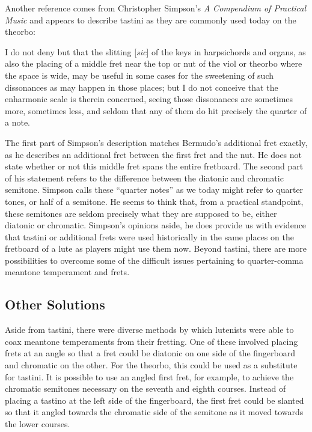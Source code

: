 Another reference comes from Christopher Simpson's \textit{A Compendium of Practical
Music} and appears to describe tastini as they are commonly used today on the theorbo:
\begin{blocks}
I do not deny but that the slitting [\textit{sic}] of the keys in harpsichords and organs, as also the
placing of a middle fret near the top or nut of the viol or theorbo where the space is
wide, may be useful in some cases for the sweetening of such dissonances as may happen
in those places; but I do not conceive that the enharmonic scale is therein concerned,
seeing those dissonances are sometimes more, sometimes less, and seldom that any of them
do hit precisely the quarter of a note. \autocite[51]{CS:1}
\end{blocks}
The first part of Simpson's description matches Bermudo's additional fret exactly, as he describes
an additional fret between the first fret and the nut. He does not state whether or not this middle
fret spans the entire fretboard. The second part of his statement refers to the difference between
the diatonic and chromatic semitone. Simpson calls these ``quarter notes'' as we today might refer
to quarter tones, or half of a semitone. He seems to think that, from a practical standpoint, these
semitones are seldom precisely what they are supposed to be, either diatonic or chromatic. Simpson's
opinions aside, he does provide us with evidence that tastini or additional frets were used
historically in the same places on the fretboard of a lute as players might use them now. Beyond
tastini, there are more possibilities to overcome some of the difficult issues pertaining to
quarter-comma meantone temperament and frets.

\subsection{Other Solutions}

Aside from tastini, there were diverse methods by which lutenists were able to
coax meantone temperaments from their fretting. One of these involved placing frets at
an angle so that a fret could be diatonic on one side of the fingerboard and chromatic on
the other. For the theorbo, this could be used as a substitute for tastini. It
is possible to use an angled first fret, for example, to achieve the chromatic
semitones necessary on the seventh and eighth courses. Instead of placing a tastino at
the left side of the fingerboard, the first fret could be slanted so that it
angled towards the chromatic side of the semitone as it moved towards the
lower courses.

